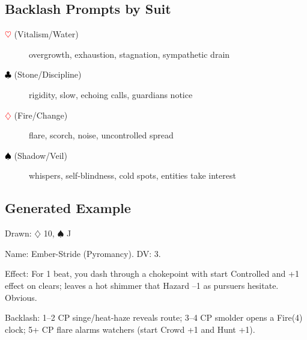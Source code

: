\subsection{Backlash Prompts by Suit}
\begin{description}
\item[\textcolor{red}{$\heartsuit$} (Vitalism/Water)] overgrowth, exhaustion, stagnation, sympathetic drain
\item[\textcolor{black}{$\clubsuit$} (Stone/Discipline)] rigidity, slow, echoing calls, guardians notice
\item[\textcolor{red}{$\diamondsuit$} (Fire/Change)] flare, scorch, noise, uncontrolled spread
\item[\textcolor{black}{$\spadesuit$} (Shadow/Veil)] whispers, self-blindness, cold spots, entities take interest
\end{description}

\subsection{Generated Example}
Drawn: $\diamondsuit$ 10, $\spadesuit$ J

Name: Ember-Stride (Pyromancy). DV: 3.

Effect: For 1 beat, you dash through a chokepoint with start Controlled and +1 effect on clears; leaves a hot shimmer that Hazard --1 as pursuers hesitate. Obvious.

Backlash: 1--2 CP singe/heat-haze reveals route; 3--4 CP smolder opens a Fire(4) clock; 5+ CP flare alarms watchers (start Crowd +1 and Hunt +1).
